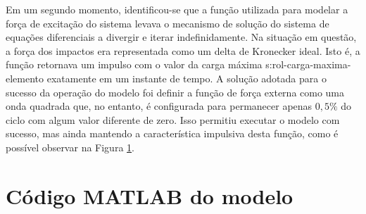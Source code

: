 \documentclass[12pt,oneside,english,brazil,lmodern,siglas,simbolos,cite=num]{ucsmonograph}
\begin{document}
	Em um segundo momento, identificou-se que a função utilizada para modelar a força de excitação do sistema levava o mecanismo de solução do sistema de equações diferenciais a divergir e iterar indefinidamente.
	Na situação em questão, a força dos impactos era representada como um delta de Kronecker ideal.
	Isto é, a função retornava um impulso com o valor da carga máxima \gls{s:rol-carga-maxima-elemento} exatamente em um instante de tempo.
	A solução adotada para o sucesso da operação do modelo foi definir a função de força externa como uma onda quadrada que, no entanto, é configurada para permanecer apenas $0,5\%$ do ciclo com algum valor diferente de zero.
	Isso permitiu executar o modelo com sucesso, mas ainda mantendo a característica impulsiva desta função, como é possível observar na Figura \ref{fig:res:impulsos}.
	
	\begin{figure}[h]
		\label{fig:res:impulsos}
	\end{figure}

	\begin{figure}[h]
	\end{figure}

	\begin{figure}[t]
	\end{figure}
	
	\postextual
	
	
	
	\apendices
	\chapter{Código MATLAB do modelo} \label{apc:codigo}
	
		
\end{document}
